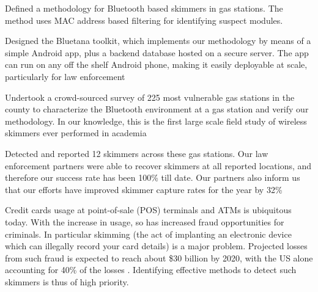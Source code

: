 	\item Defined a methodology for Bluetooth based skimmers in gas stations. The method uses MAC address based filtering for identifying suspect modules.
	\item Designed the Bluetana toolkit, which implements our methodology by means of a simple Android app, plus a backend database hosted on a secure server. The app can run on any off the shelf Android phone, making it easily deployable at scale, particularly for law enforcement
	\item Undertook a crowd-sourced survey of 225 most vulnerable gas stations in the county to characterize the Bluetooth environment at a gas station and verify our methodology. In our knowledge, this is the first large scale field study of wireless skimmers ever performed in academia
	\item Detected and reported 12 skimmers across these gas stations. Our law enforcement partners were able to recover skimmers at all reported locations, and therefore our success rate has been 100\% till date. Our partners also inform us that our efforts have improved skimmer capture rates for the year by 32\%
\fi %


Credit cards usage at point-of-sale (POS) terminals and ATMs is ubiquitous today. With the increase in usage, so has increased fraud opportunities for criminals. In particular skimming (the act of implanting an electronic device which can illegally record your card details) is a major problem. Projected losses from such fraud is expected to reach about \$30 billion by 2020, with the US alone accounting for 40\% of the losses \cite{nilsonreport2017}. Identifying effective methods to detect such skimmers is thus of high priority.

